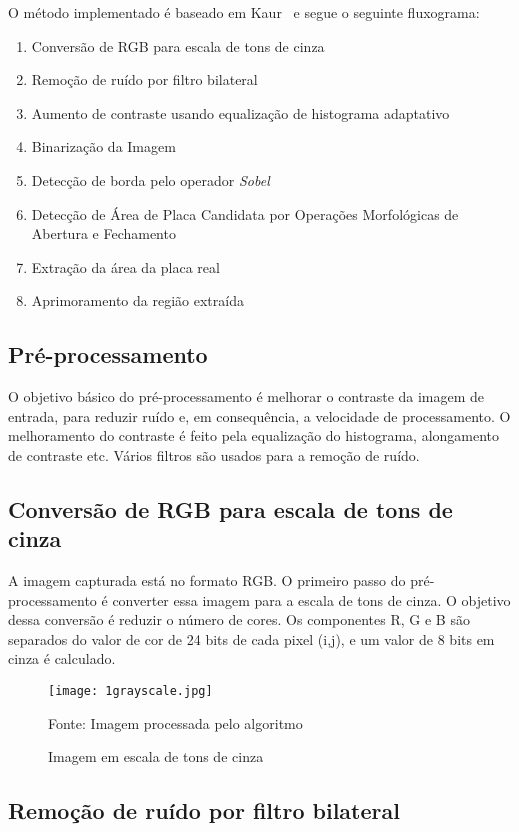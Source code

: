 O método implementado é baseado em Kaur~\cite{kaur2014efficient} e segue o seguinte fluxograma:

\begin{enumerate}
	\item Conversão de RGB para escala de tons de cinza
	\item Remoção de ruído por filtro bilateral
	\item Aumento de contraste usando equalização de histograma adaptativo
	\item Binarização da Imagem
	\item Detecção de borda pelo operador \emph{Sobel}
	\item Detecção de Área de Placa Candidata por Operações Morfológicas de Abertura e Fechamento
	\item Extração da área da placa real
	\item Aprimoramento da região extraída
\end{enumerate}

\subsection{Pré-processamento}

O objetivo básico do pré-processamento é melhorar o contraste da imagem de
entrada, para reduzir ruído e, em consequência, a velocidade de
processamento. O melhoramento do contraste é feito pela equalização do
histograma, alongamento de contraste etc. Vários filtros são usados para a
remoção de ruído.

\subsection{Conversão de RGB para escala de tons de cinza}

A imagem capturada está no formato RGB\@. O primeiro passo do pré-processamento é
converter essa imagem para a escala de tons de cinza. O objetivo dessa conversão é reduzir
o número de cores. Os componentes R, G e B são separados do valor de cor de 24
bits de cada pixel (i,j), e um valor de 8 bits em cinza é calculado.

\begin{figure}[H]
	\centering
	\texttt{[image: 1grayscale.jpg]}
	\caption{Imagem em escala de tons de cinza}
Fonte: Imagem processada pelo algoritmo
	\label{fig:ext_gray_scale}
\end{figure}

\subsection{Remoção de ruído por filtro bilateral}

